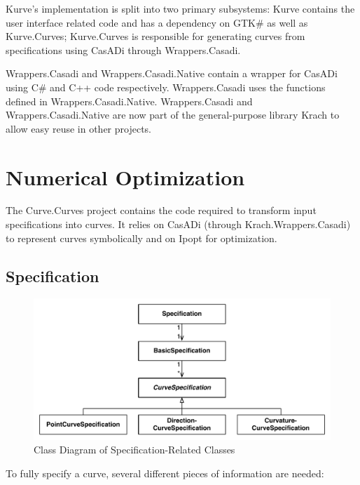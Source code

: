 \documentclass[a4paper]{article}
\begin{document}
				Kurve's implementation is split into two primary subsystems: Kurve contains the user interface related code and has a dependency on GTK\# as well as Kurve.Curves; Kurve.Curves is responsible for generating curves from specifications using CasADi through Wrappers.Casadi. 
				
				Wrappers.Casadi and Wrappers.Casadi.Native contain a wrapper for CasADi using C\# and C++ code respectively. Wrappers.Casadi uses the functions defined in Wrappers.Casadi.Native. Wrappers.Casadi and Wrappers.Casadi.Native are now part of the general-purpose library Krach to allow easy reuse in other projects.
		
		\section{Numerical Optimization}
			The Curve.Curves project contains the code required to transform input specifications into curves. It relies on CasADi (through Krach.Wrappers.Casadi) to represent curves symbolically and on Ipopt for optimization.
			
			\subsection{Specification}
				\begin{figure}[htb]
					\centering
					\includegraphics[width=\textwidth]{../resources/specification_class_diagram.pdf}
					\caption{Class Diagram of Specification-Related Classes}
					\label{figure:specification_class_diagram}
				\end{figure}
				
				To fully specify a curve, several different pieces of information are needed:
				
\end{document}
